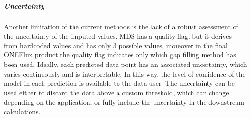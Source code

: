 \documentclass{article}
\let\Oldsubsection\subsection
\renewcommand{\subsection}{\FloatBarrier\Oldsubsection}
\begin{document}
\subparagraph{Uncertainty} Another limitation of the current methods is the lack of a robust assessment of the uncertainty of the imputed values. MDS has a quality flag, but it derives from hardcoded values and has only 3 possible values, moreover in the final ONEFlux product the quality flag indicates only which gap filling method has been used. Ideally, each predicted data point has an associated uncertainty, which varies continuously and is interpretable. In this way, the level of confidence of the model in each prediction is available to the data user. The uncertainty can be used either to discard the data above a custom threshold, which can change depending on the application, or fully include the uncertainty in the downstream calculations.




\end{document}

